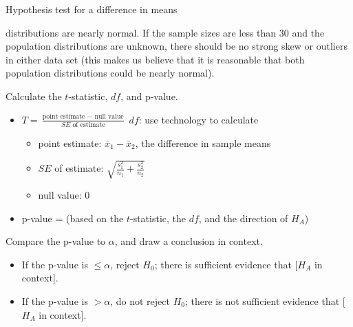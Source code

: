 \begin{onebox}{Hypothesis test for a difference in means}
{\begin{itemize}
distributions are nearly normal.  If the sample sizes are less than 30 and the population distributions are unknown, there should be no strong skew or outliers in either data set (this makes us believe that it is reasonable that both population distributions could be nearly normal).    
\end{itemize}
}
   Calculate the $t$-statistic, $df$, and p-value.
\begin{itemize}
\item[] $T = \frac{\text{point estimate } - \text{ null value}}{SE \text{ of estimate}}$ \quad $df$: use technology to calculate
\begin{itemize}
\item[] point estimate: $\bar{x}_1 - \bar{x}_2$, the difference in sample means 
\item[] $SE$ of estimate:  $\sqrt{\frac{s^2_1}{n_1}+\frac{s^2_2}{n_2}}$
\item[] null value: 0
\end{itemize}
\item[] p-value = (based on the $t$-statistic, the $df$, and the direction of $H_A$)
\end{itemize}
  Compare the p-value to $\alpha$, and draw a conclusion in context.\vspace{-1mm}
\begin{itemize}
\item[] If the p-value is $\le \alpha$, reject $H_0$; there is sufficient evidence that [$H_A$ in context]. 
\item[] If the p-value is $> \alpha$, do not reject $H_0$; there is not sufficient evidence that [$H_A$ in context].
\end{itemize}\end{onebox}




\D{\newpage}


